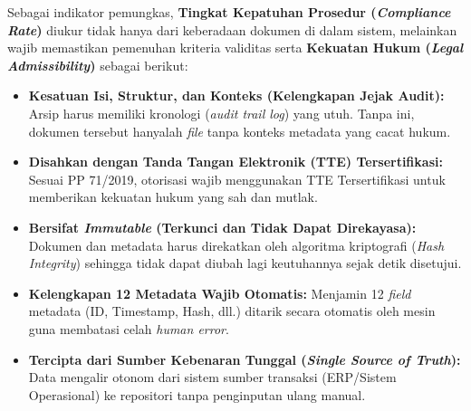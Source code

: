 \documentclass[12pt,a4paper]{report}
\begin{document}
Sebagai indikator pemungkas, \textbf{Tingkat Kepatuhan Prosedur (\textit{Compliance Rate})} diukur tidak hanya dari keberadaan dokumen di dalam sistem, melainkan wajib memastikan pemenuhan kriteria validitas serta \textbf{Kekuatan Hukum (\textit{Legal Admissibility})} sebagai berikut:
\begin{itemize}[leftmargin=*]
    \item \textbf{Kesatuan Isi, Struktur, dan Konteks (Kelengkapan Jejak Audit):} Arsip harus memiliki kronologi (\textit{audit trail log}) yang utuh. Tanpa ini, dokumen tersebut hanyalah \textit{file} tanpa konteks metadata yang cacat hukum.
    \item \textbf{Disahkan dengan Tanda Tangan Elektronik (TTE) Tersertifikasi:} Sesuai PP 71/2019, otorisasi wajib menggunakan TTE Tersertifikasi untuk memberikan kekuatan hukum yang sah dan mutlak.
    \item \textbf{Bersifat \textit{Immutable} (Terkunci dan Tidak Dapat Direkayasa):} Dokumen dan metadata harus direkatkan oleh algoritma kriptografi (\textit{Hash Integrity}) sehingga tidak dapat diubah lagi keutuhannya sejak detik disetujui.
    \item \textbf{Kelengkapan 12 Metadata Wajib Otomatis:} Menjamin 12 \textit{field} metadata (ID, Timestamp, Hash, dll.) ditarik secara otomatis oleh mesin guna membatasi celah \textit{human error}.
    \item \textbf{Tercipta dari Sumber Kebenaran Tunggal (\textit{Single Source of Truth}):} Data mengalir otonom dari sistem sumber transaksi (ERP/Sistem Operasional) ke repositori tanpa penginputan ulang manual.
\end{itemize}
\end{document}
